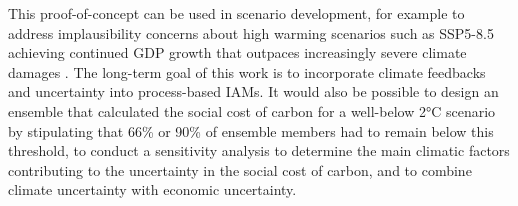 \documentclass{article}
\begin{document}
This proof-of-concept can be used in scenario development, for example to address implausibility concerns about high warming scenarios such as SSP5-8.5 achieving continued GDP growth that outpaces increasingly severe climate damages \citep{Woodard2019}. The long-term goal of this work is to incorporate climate feedbacks and uncertainty into process-based IAMs. It would also be possible to design an ensemble that calculated the social cost of carbon for a well-below 2°C scenario by stipulating that 66\% or 90\% of ensemble members had to remain below this threshold, to conduct a sensitivity analysis to determine the main climatic factors contributing to the uncertainty in the social cost of carbon, and to combine climate uncertainty with economic uncertainty.


\end{document}
